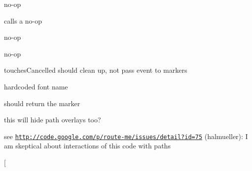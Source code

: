 \begin{DoxyRefList}
\item[\label{bug__bug000023}%
\hypertarget{bug__bug000023}{}%
成员 \hyperlink{interface_r_m_map_renderer_a388de8a3bd1c56a07bc69f8967f34037}{\mbox{[}R\-M\-Map\-Renderer layer\mbox{]}} ]no-\/op  
\item[\label{bug__bug000020}%
\hypertarget{bug__bug000020}{}%
成员 \hyperlink{interface_r_m_map_renderer_aa509a04f8b9702d4a4ea3010ca681f05}{\mbox{[}R\-M\-Map\-Renderer map\-Image\-Loaded\-:\mbox{]}} ]calls a no-\/op  
\item[\label{bug__bug000022}%
\hypertarget{bug__bug000022}{}%
成员 \hyperlink{interface_r_m_map_renderer_a9191dc45f6215897f0e601e085850d1d}{\mbox{[}R\-M\-Map\-Renderer set\-Frame\-:\mbox{]}} ]no-\/op  
\item[\label{bug__bug000019}%
\hypertarget{bug__bug000019}{}%
成员 \hyperlink{interface_r_m_map_renderer_a5351f5a213da59e4646c0ad6e49db22b}{\mbox{[}R\-M\-Map\-Renderer set\-Needs\-Display\mbox{]}} ]no-\/op  
\item[\label{bug__bug000025}%
\hypertarget{bug__bug000025}{}%
成员 \hyperlink{interface_r_m_map_view_a464f5e8b6bdf7ce72e7e30e17972a047}{\mbox{[}R\-M\-Map\-View touches\-Cancelled\-:with\-Event\-:\mbox{]}} ]touches\-Cancelled should clean up, not pass event to markers  
\item[\label{bug__bug000026}%
\hypertarget{bug__bug000026}{}%
成员 \hyperlink{interface_r_m_marker_a74563af9b6eaf61603636c1202457ecb}{\mbox{[}R\-M\-Marker change\-Label\-Using\-Text\-:\mbox{]}} ]hardcoded font name  
\item[\label{bug__bug000027}%
\hypertarget{bug__bug000027}{}%
成员 \hyperlink{interface_r_m_marker_manager_aaa93d51f42410bfa5ffe089b9382bed5}{\mbox{[}R\-M\-Marker\-Manager add\-Marker\-:At\-Lat\-Long\-:\mbox{]}} ]should return the marker  
\item[\label{bug__bug000029}%
\hypertarget{bug__bug000029}{}%
成员 \hyperlink{interface_r_m_marker_manager_ad3403a9206e18ced0f63afdc17645726}{\mbox{[}R\-M\-Marker\-Manager hide\-All\-Markers\mbox{]}} ]this will hide path overlays too?  
\item[\label{bug__bug000028}%
\hypertarget{bug__bug000028}{}%
成员 \hyperlink{interface_r_m_marker_manager_acc176d752af4381c94e357c7916707fc}{\mbox{[}R\-M\-Marker\-Manager remove\-Markers\mbox{]}} ]see \href{http://code.google.com/p/route-me/issues/detail?id=75}{\tt http\-://code.\-google.\-com/p/route-\/me/issues/detail?id=75} (halmueller)\-: I am skeptical about interactions of this code with paths  
\item[\label{bug__bug000030}%

\end{DoxyRefList}
